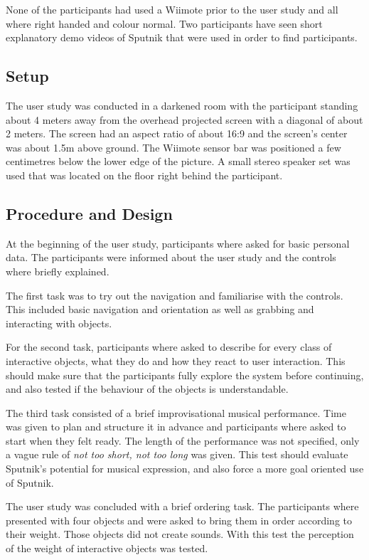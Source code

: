 \documentclass[10pt,a4paper]{scrartcl}
\begin{document}
None of the participants had used a Wiimote prior to the user study and all where right handed and colour normal. Two participants have seen short explanatory demo videos of Sputnik that were used in order to find participants.

\subsection{Setup}
The user study was conducted in a darkened room with the participant standing about 4 meters away from the overhead projected screen with a diagonal of about 2 meters. The screen had an aspect ratio of about 16:9 and the screen's center was about 1.5m above ground. The Wiimote sensor bar was positioned a few centimetres below the lower edge of the picture. A small stereo speaker set was used that was located on the floor right behind the participant.

\subsection{Procedure and Design}
At the beginning of the user study, participants where asked for basic personal data. The participants were informed about the user study and the controls where briefly explained. 

The first task was to try out the navigation and familiarise with the controls. This included basic navigation and orientation as well as grabbing and interacting with objects.

For the second task, participants where asked to describe for every class of interactive objects, what they do and how they react to user interaction. This should make sure that the participants fully explore the system before continuing, and also tested if the behaviour of the objects is understandable.

The third task consisted of a brief improvisational musical performance. Time was given to plan and structure it in advance and participants where asked to start when they felt ready. The length of the performance was not specified, only a vague rule of \emph{not too short, not too long} was given. This test should evaluate Sputnik's potential for musical expression, and also force a more goal oriented use of Sputnik.

The user study was concluded with a brief ordering task. The participants where presented with four objects and were asked to bring them in order according to their weight. Those objects did not create sounds. With this test the perception of the weight of interactive objects was tested.
\end{document}

